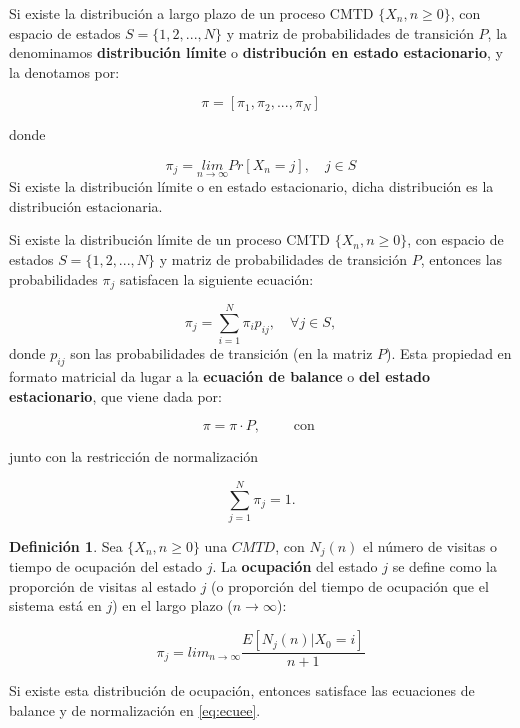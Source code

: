 \documentclass[
]{book}
\newenvironment{yellowbox}{
  \definecolor{shadecolor}{rgb}{210, 180, 140}  
  \color{black}
  \begin{shaded}}
 {\end{shaded}}
\theoremstyle{definition}
\newtheorem{definition}{Definición}[chapter]
\theoremstyle{definition}
\theoremstyle{definition}
\theoremstyle{definition}
\theoremstyle{remark}
\begin{document}
\begin{yellowbox}

Si existe la distribución a largo plazo de un proceso CMTD \(\{X_n, n \geq 0\}\), con espacio de estados \(S =\{1, 2,..., N\}\) y matriz de probabilidades de transición \(P\), la denominamos \textbf{distribución límite} o \textbf{distribución en estado estacionario}, y la denotamos por:

\[\pi = [\pi_1, \pi_2,...,\pi_N]\]

donde

\[\pi_j = \underset{n \rightarrow \infty}{lim} Pr[X_n = j], \quad j \in S\]
Si existe la distribución límite o en estado estacionario, dicha distribución es la distribución estacionaria.

\end{yellowbox}

\begin{yellowbox}

Si existe la distribución límite de un proceso CMTD \(\{X_n, n \geq 0\}\), con espacio de estados \(S =\{1, 2,..., N\}\) y matriz de probabilidades de transición \(P\), entonces las probabilidades \(\pi_j\) satisfacen la siguiente ecuación:

\[\pi_j = \sum_{i=1}^N \pi_i p_{ij}, \quad \forall j \in S,\]
donde \(p_{ij}\) son las probabilidades de transición (en la matriz \(P\)). Esta propiedad en formato matricial da lugar a la \textbf{ecuación de balance} o \textbf{del estado estacionario}, que viene dada por:

\begin{equation}
\pi = \pi \cdot P, \qquad \text{ con } 
\label{eq:ecuee}
\end{equation}

junto con la restricción de normalización

\[\sum_{j=1}^N \pi_j = 1.\]

\end{yellowbox}

\begin{yellowbox}

\begin{definition}
Sea \(\{X_n, n \geq 0\}\) una \(CMTD\), con \(N_j(n)\) el número de visitas o tiempo de ocupación del estado \(j\). La \textbf{ocupación} del estado \(j\) se define como la proporción de visitas al estado \(j\) (o proporción del tiempo de ocupación que el sistema está en \(j\)) en el largo plazo (\(n \rightarrow \infty\)):

\begin{equation}
\pi_j=lim_{n \rightarrow \infty} \frac{E[N_j(n)|X_0=i]}{n+1}
\label{eq:ocupacion}
\end{equation}

Si existe esta distribución de ocupación, entonces satisface las ecuaciones de balance y de normalización en \eqref{eq:ecuee}.
\end{definition}

\end{yellowbox}
\end{document}
